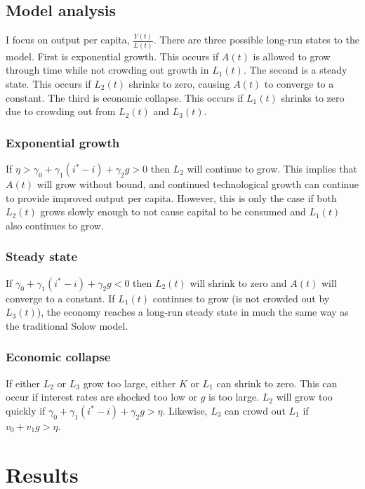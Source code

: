 \documentclass[12pt]{article}
\theoremstyle{definition}
\begin{document}
\subsection{Model analysis}

I focus on output per capita, \(\frac{Y(t)}{L(t)}\). There are three possible long-run states to the model.  First is exponential growth.  This occurs if \(A(t)\) is allowed to grow through time while not crowding out growth in \(L_1(t)\).  The second is a steady state.  This occurs if \(L_2(t)\) shrinks to zero, causing \(A(t)\) to converge to a constant.  The third is economic collapse.  This occurs if \(L_1(t)\) shrinks to zero due to crowding out from \(L_2(t)\) and \(L_3(t)\).  

\subsubsection{Exponential growth}
If \(\eta >\gamma_0+\gamma_1 (i^*-i)+\gamma_2 g > 0\) then \(L_2\) will continue to grow.  This implies that \(A(t)\) will grow without bound, and continued technological growth can continue to provide improved output per capita.  However, this is only the case if both \(L_2(t)\) grows slowly enough to not cause capital to be consumed and \(L_1(t)\) also continues to grow.  

\subsubsection{Steady state}
If \(\gamma_0+\gamma_1 (i^*-i)+\gamma_2 g <0\) then \(L_2(t)\) will shrink to zero and \(A(t)\) will converge to a constant.  If \(L_1(t)\) continues to grow (is not crowded out by \(L_3(t)\)), the economy reaches a long-run steady state in much the same way as the traditional Solow model.

\subsubsection{Economic collapse}
If either \(L_2\) or \(L_3\) grow too large, either \(K\) or \(L_1\) can shrink to zero.  This can occur if interest rates are shocked too low or \(g\) is too large.  \(L_2\) will grow too quickly if \(\gamma_0+\gamma_1 (i^*-i)+\gamma_2 g > \eta\).  Likewise, \(L_3\) can crowd out \(L_1\) if \(v_0+v_1g > \eta\).  

\section{Results}
\end{document}
